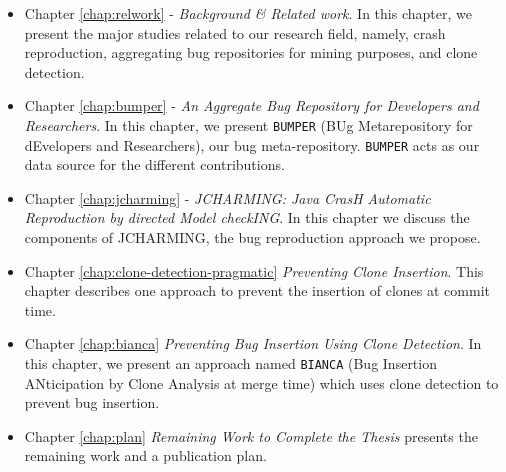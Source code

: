 \begin{itemize}
	\item Chapter \ref{chap:relwork} - {\it Background \& Related work}.
	In this chapter, we present the major studies related to our research field, namely, crash reproduction, aggregating bug repositories for mining purposes, and clone detection.

	\item Chapter \ref{chap:bumper} - {\it An Aggregate Bug Repository for Developers and Researchers}.
	In this chapter, we present {\tt BUMPER} (BUg Metarepository for  dEvelopers  and  Researchers), our bug meta-repository. {\tt BUMPER} acts as our data source for the different contributions.

	\item Chapter \ref{chap:jcharming} - {\it JCHARMING: Java CrasH Automatic Reproduction by directed Model checkING}.
	In this chapter we discuss the components of JCHARMING, the bug reproduction approach we propose.

	\item Chapter \ref{chap:clone-detection-pragmatic} {\it Preventing Clone Insertion}. This chapter describes one approach to     prevent the insertion of clones at commit time.

	\item Chapter \ref{chap:bianca} {\it Preventing Bug Insertion Using Clone Detection}. In this chapter, we present an approach named {\tt BIANCA} (Bug Insertion ANticipation by Clone Analysis at merge time) which uses clone detection to prevent bug insertion.

	\item Chapter \ref{chap:plan} {\it Remaining Work to Complete the Thesis} presents  the remaining work and a publication plan.
\end{itemize}
